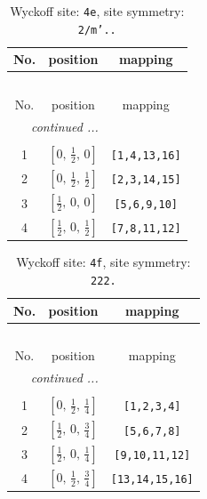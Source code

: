 \documentclass[fleqn,8pt]{jsarticle}
\begin{document}
\begin{longtable}{ccc}
\caption{Wyckoff site: {\tt 4e}, site symmetry: {\tt 2/m'..}}
 \\
 \hline \hline
No. & position & mapping \\ \hline \endfirsthead

\multicolumn{2}{l}{\tablename\ \thetable{}} \\
 \hline \hline
No. & position & mapping \\ \hline \endhead

 \hline \hline
\multicolumn{2}{r}{\footnotesize\it continued ...} \\ \endfoot

 \hline \hline
\multicolumn{2}{r}{} \\ \endlastfoot

1 & $\left[ 0,\, \frac{1}{2},\, 0 \right]$ & {\tt [1,4,13,16]} \\ \hline
2 & $\left[ 0,\, \frac{1}{2},\, \frac{1}{2} \right]$ & {\tt [2,3,14,15]} \\ \hline
3 & $\left[ \frac{1}{2},\, 0,\, 0 \right]$ & {\tt [5,6,9,10]} \\ \hline
4 & $\left[ \frac{1}{2},\, 0,\, \frac{1}{2} \right]$ & {\tt [7,8,11,12]} \\
\end{longtable}
\renewcommand{\arraystretch}{1.2}
\begin{longtable}{ccc}
\caption{Wyckoff site: {\tt 4f}, site symmetry: {\tt 222.}}
 \\
 \hline \hline
No. & position & mapping \\ \hline \endfirsthead

\multicolumn{2}{l}{\tablename\ \thetable{}} \\
 \hline \hline
No. & position & mapping \\ \hline \endhead

 \hline \hline
\multicolumn{2}{r}{\footnotesize\it continued ...} \\ \endfoot

 \hline \hline
\multicolumn{2}{r}{} \\ \endlastfoot

1 & $\left[ 0,\, \frac{1}{2},\, \frac{1}{4} \right]$ & {\tt [1,2,3,4]} \\ \hline
2 & $\left[ \frac{1}{2},\, 0,\, \frac{3}{4} \right]$ & {\tt [5,6,7,8]} \\ \hline
3 & $\left[ \frac{1}{2},\, 0,\, \frac{1}{4} \right]$ & {\tt [9,10,11,12]} \\ \hline
4 & $\left[ 0,\, \frac{1}{2},\, \frac{3}{4} \right]$ & {\tt [13,14,15,16]} \\
\end{longtable}
\end{document}
